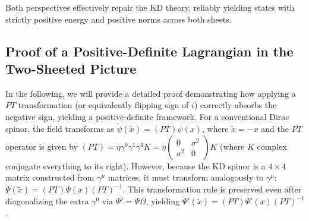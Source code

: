 Both perspectives effectively repair the KD theory, reliably yielding states with strictly positive energy and positive norms across both sheets.

\subsection{Proof of a Positive-Definite Lagrangian in the Two-Sheeted Picture}

In the following, we will provide a detailed proof demonstrating how applying a $PT$ transformation (or equivalently flipping sign of $i$) correctly absorbs the negative sign, yielding a positive-definite framework. 
For a conventional Dirac spinor, the field transforms as $\tilde\psi(\tilde x)=(PT)\psi(x)$, where $\tilde x=-x$ and the $PT$ operator is given by $(PT)=\eta \gamma^0\gamma^1\gamma^3K=\eta\begin{pmatrix}0&\sigma^2\\ \sigma^2 & 0\end{pmatrix} K$ (where $K$ complex conjugate everything to its right). However, because the KD spinor is a $4\times 4$ matrix constructed from $\gamma^\mu$ matrices, it must transform analogously to $\gamma^\mu$: $\tilde\Psi(\tilde x)=(PT)\Psi(x) (PT)^{-1}$. This transformation rule is preserved even after diagonalizing the extra $\gamma^0$ via $\Psi'=\Psi\Omega$, yielding $\tilde\Psi'(\tilde x)=(PT)\Psi'(x) (PT)^{-1}$. 

